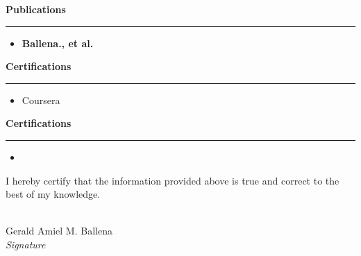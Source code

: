 \documentclass[a4paper,10pt]{article}
\newcommand{\sectiontitle}[1]{\vspace{10pt}\textbf{\Large #1}\vspace{5pt}\hrule\vspace{10pt}}
\begin{document}
	
	\sectiontitle{Publications}
	\begin{itemize}[left=0pt]
		\item \textbf{Ballena., et al.} 
	\end{itemize}
	
	\sectiontitle{Certifications}
	\begin{itemize}[left=0pt]
		\item Coursera
	\end{itemize}
	
	
	\sectiontitle{Certifications}
	\begin{itemize}[left=0pt]
		\item 
	\end{itemize}
	
	\vspace{20pt}
	\noindent I hereby certify that the information provided above is true and correct to the best of my knowledge.
	
	\vspace{40pt}
	\noindent\makebox[2in]{\hrulefill} \\
	Gerald Amiel M. Ballena\\
	\textit{Signature}
	
\end{document}
